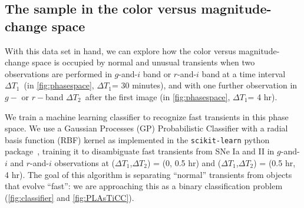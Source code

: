 \documentclass[letterpaper,longauthor,trackchanges,twocolumn,onecolappendix,sort&compress]{aastex62}
\newcommand{\dtone}{\ensuremath{\Delta T_1}}
\newcommand{\dttwo}{\ensuremath{\Delta T_2}}
\newcommand\rahul[1]{\textcolor{blue}{#1}}
\begin{document}





\subsection{The sample in the color versus magnitude-change space}\label{sec:classification}

With this data set in hand, we can explore how the color versus magnitude-change space is occupied by normal and unusual transients when two observations are performed in $g$-and-$i$ band or $r$-and-$i$ band at a time interval \dtone\ (in \autoref{fig:phasespace}, \dtone = 30 minutes), and with one further observation in $g-$ or $r-$band \dttwo\ after the first image (in \autoref{fig:phasespace}, \dtone = 4 hr). 

We train a machine learning classifier to recognize fast transients in this phase space. We use a Gaussian Processes (GP) Probabilistic Classifier \citep{Rasmussen06gaussianprocesses} with a radial basis function (RBF) kernel as implemented in the {\tt scikit-learn} python package~\citep{scikit-learn}, training it to disambiguate fast transients from SNe Ia and II in $g$-and-$i$ and $r$-and-$i$ observations at (\dtone,\dttwo) = (0, 0.5 hr) and (\dtone,\dttwo) = (0.5 hr, 4 hr). The goal of this algorithm is  separating ``normal'' transients from objects that evolve ``fast'': we are approaching this as a binary classification problem (\autoref{fig:classifier} and \autoref{fig:PLAsTiCC}).
\end{document}
